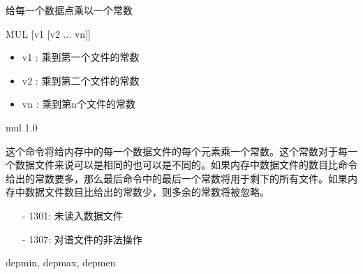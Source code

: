 \label{cmd:mul}

给每一个数据点乘以一个常数

\begin{SACSTX}
MUL [v1 [v2 ... vn]]
\end{SACSTX}

\begin{itemize}
\item v1 :  乘到第一个文件的常数 
\item v2 :  乘到第二个文件的常数 
\item vn : 乘到第n个文件的常数 
\end{itemize}

\begin{SACDFT}
mul 1.0
\end{SACDFT}

这个命令将给内存中的每一个数据文件的每个元素乘一个常数。这个常数对于每一个数据文件来说可以是相同的也可以是不同的。如果内存中数据文件的数目比命令给出的常数要多，那么最后命令中的最后一个常数将用于剩下的所有文件。如果内存中数据文件数目比给出的常数少，则多余的常数将被忽略。

\begin{itemize}
\item[-]1301: 未读入数据文件
\item[-]1307: 对谱文件的非法操作
\end{itemize}

depmin, depmax, depmen
